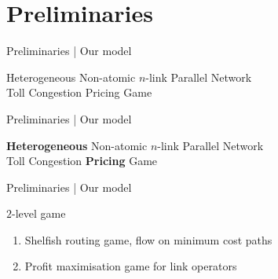 \documentclass{beamer}
\begin{document}
\section{Preliminaries}

\begin{frame}{Preliminaries | Our model}
	\begin{center}
		Heterogeneous Non-atomic $n$-link Parallel Network\\
		Toll Congestion Pricing Game
	\end{center}
\end{frame}
\begin{frame}{Preliminaries | Our model}
	\begin{center}
		\textbf{Heterogeneous} Non-atomic $n$-link Parallel Network\\
		Toll Congestion \textbf{Pricing} Game
	\end{center}
\end{frame}

\begin{frame}{Preliminaries | Our model}
	\;
	\begin{block}{$2$-level game}
		\begin{enumerate}
			\item Shelfish routing game, flow on minimum cost paths
			\item Profit maximisation game for link operators
		\end{enumerate}
	\end{block}
\end{frame}
\end{document}
